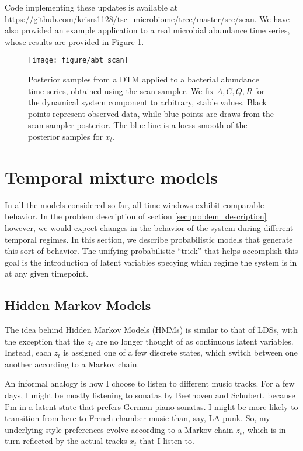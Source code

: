\documentclass[14pt]{extreport}
\begin{document}
Code implementing these updates is available at
\url{https://github.com/krisrs1128/tsc_microbiome/tree/master/src/scan}. We have
also provided an example application to a real microbial abundance time series,
whose results are provided in Figure \ref{fig:abt_scan}.

\begin{figure}
  \centering
  \texttt{[image: figure/abt\_scan]}
  \caption{Posterior samples from a DTM applied to a bacterial abundance time
    series, obtained using the scan sampler. We fix $A, C, Q, R$ for the
    dynamical system component to arbitrary, stable values. Black points
    represent observed data, while blue points are draws from the scan sampler
    posterior. The blue line is a loess smooth of the posterior samples for
    $x_t$.
    \label{fig:abt_scan}}
\end{figure}

\section{Temporal mixture models}
\label{sec:temporal_mixture_models}

In all the models considered so far, all time windows exhibit comparable
behavior. In the problem description of section \ref{sec:problem_description}
however, we would expect changes in the behavior of the system during different
temporal regimes. In this section, we describe probabilistic models that
generate this sort of behavior. The unifying probabilistic ``trick'' that helps
accomplish this goal is the introduction of latent variables specying which
regime the system is in at any given timepoint.

\subsection{Hidden Markov Models}
\label{subsec:hmms}

The idea behind Hidden Markov Models (HMMs) is similar to that of LDSs, with the
exception that the $z_{t}$ are no longer thought of as continuous latent
variables. Instead, each $z_{t}$ is assigned one of a few discrete states,
which switch between one another according to a Markov chain.

An informal analogy is how I choose to listen to different music tracks. For a
few days, I might be mostly listening to sonatas by Beethoven and Schubert,
because I'm in a latent state that prefers German piano sonatas. I might be more
likely to transition from here to French chamber music than, say, LA punk. So,
my underlying style preferences evolve according to a Markov chain $z_{t}$,
which is in turn reflected by the actual tracks $x_{t}$ that I listen to.
\end{document}
